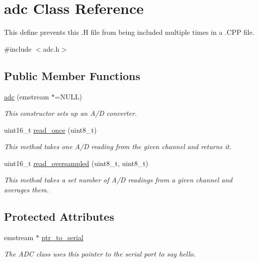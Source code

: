 \hypertarget{classadc}{\section{adc Class Reference}
\label{classadc}
}


This define prevents this .H file from being included multiple times in a .C\-P\-P file.  




{\ttfamily \#include $<$adc.\-h$>$}

\subsection*{Public Member Functions}
\begin{DoxyCompactItemize}
\item 
\hyperlink{classadc_af3b8262c08f5fc5ae325a20622883424}{adc} (emstream $\ast$=N\-U\-L\-L)
\begin{DoxyCompactList}\small\item\em This constructor sets up an A/\-D converter. \end{DoxyCompactList}\item 
uint16\-\_\-t \hyperlink{classadc_a2190a59696a7093e1ea605e998ccf97e}{read\-\_\-once} (uint8\-\_\-t)
\begin{DoxyCompactList}\small\item\em This method takes one A/\-D reading from the given channel and returns it. \end{DoxyCompactList}\item 
uint16\-\_\-t \hyperlink{classadc_a58f1030fe64d3dea4ccd8a2687dd6fce}{read\-\_\-oversampled} (uint8\-\_\-t, uint8\-\_\-t)
\begin{DoxyCompactList}\small\item\em This method takes a set number of A/\-D readings from a given channel and averages them. \end{DoxyCompactList}\end{DoxyCompactItemize}
\subsection*{Protected Attributes}
\begin{DoxyCompactItemize}
\item 
\hypertarget{classadc_a14680b48b723bf1adddd2741ebb18a3e}{emstream $\ast$ \hyperlink{classadc_a14680b48b723bf1adddd2741ebb18a3e}{ptr\-\_\-to\-\_\-serial}}\label{classadc_a14680b48b723bf1adddd2741ebb18a3e}

\begin{DoxyCompactList}\small\item\em The A\-D\-C class uses this pointer to the serial port to say hello. \end{DoxyCompactList}\end{DoxyCompactItemize}


